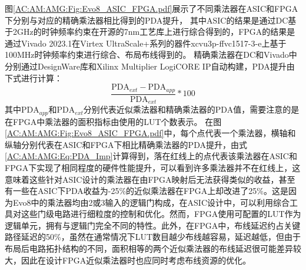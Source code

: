 图\ref{AC:AM:AMG:Fig:Evo8_ASIC_FPGA.pdf}展示了不同乘法器在ASIC和FPGA下分别与对应的精确乘法器相比得到的PDA提升，
其中ASIC的结果是通过DC基于2GHz的时钟频率约束在开源的7nm工艺库\cite{ASAP7_github}上进行综合得到的，FPGA的结果是通过Vivado 2023.1在Virtex UltraScale+系列的器件xcvu3p-ffvc1517-3-e上基于100MHz时钟频率约束进行综合、布局布线得到的。
精确乘法器在DC和Vivado中分别通过DesignWare库\cite{IP:DesignWare}和Xilinx Multiplier LogiCORE IP\cite{IP:LogiCORE}自动构建，PDA提升由下式进行计算：
\begin{equation}
    \label{AC:AM:AMG:Eq:PDA_Imp}
    \frac{\text{PDA}_{ext} - \text{PDA}_{app}}{\text{PDA}_{ext}} *100
\end{equation}
其中$\text{PDA}_{app}$和$\text{PDA}_{ext}$分别代表近似乘法器和精确乘法器的PDA值，需要注意的是在FPGA中乘法器的面积指标由使用的LUT个数表示。
在图\ref{AC:AM:AMG:Fig:Evo8_ASIC_FPGA.pdf}中，每个点代表一个乘法器，横轴和纵轴分别代表在ASIC和FPGA下相比精确乘法器的PDA提升，由式\eqref{AC:AM:AMG:Eq:PDA_Imp}计算得到，落在红线上的点代表该乘法器在ASIC和FPGA下实现了相同程度的硬件性能提升，可以看到许多乘法器并不在红线上，这意味着这些针对ASIC设计的乘法器在由FPGA映射后无法获得类似的收益，甚至有一些在ASIC下PDA收益为-25\%的近似乘法器在FPGA上却改进了25\%。这是因为Evo8\cite{AC:AM:CGP_Evoapprox8b}中的乘法器均由2或3输入的逻辑门构成，在ASIC设计中，可以利用综合工具对这些门级电路进行细粒度的控制和优化。然而，FPGA使用可配置的LUT作为逻辑单元，拥有与逻辑门完全不同的特性。此外，在FPGA中，布线延迟约占关键路径延迟的50\%\cite{FPGA:Vaughn}，虽然在通常情况下LUT数目越少布线越容易，延迟越低，但由于布局后电路拓扑结构的不同，面积相等的两个近似乘法器的布线延迟很可能差异较大，因此在设计FPGA近似乘法器时也应同时考虑布线资源的优化。



